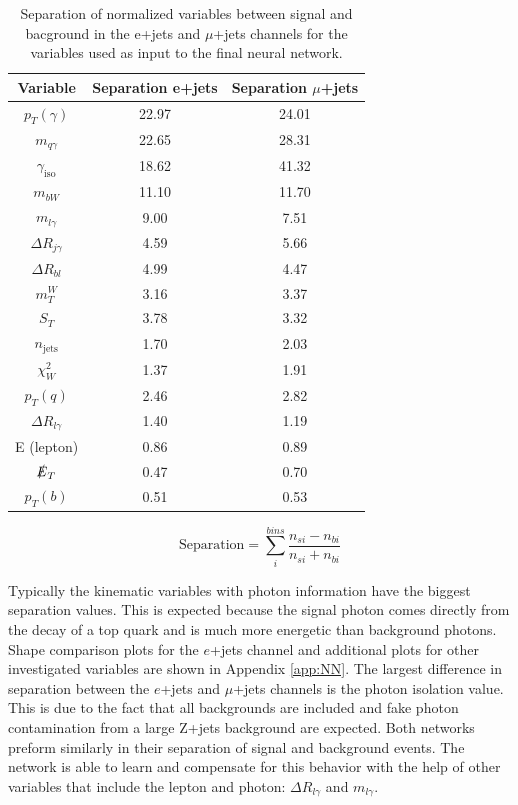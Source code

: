 \begin{table}[]
\begin{center}
{\renewcommand{\arraystretch}{1.2}
\begin{tabular}{ccc}
\hline
Variable  &  Separation e+jets   & Separation $\mu$+jets   \\  \hline 
$p_T (\gamma)$            &  22.97   & 24.01	\\
$m_{q\gamma}$           &   22.65 &  28.31	\\
$\gamma_{\text{iso}}$   &  18.62   &  41.32	\\   
$m_{bW} $                    &  11.10   &  11.70 	\\
$m_{l\gamma}$             &  9.00  &   7.51	\\
$\Delta R_{j\gamma}$ &  4.59   &  5.66	\\
$\Delta R_{b l}$            &  4.99   &  4.47 	\\
$m_{T}^{W}$              &   3.16  &   3.37	\\
$S_T$                            &  3.78   &  3.32 	\\
$n_{\text{jets}}$         &  1.70   &   2.03	\\
$\chi^{2}_{W}$           &  1.37 &   1.91	 	\\
$p_T (q)$                      &  2.46    &  2.82	\\
$\Delta R_{l \gamma}$ &   1.40 &  1.19		\\
E (lepton)                       &  0.86  &  0.89	\\	
$\slashed{E}_T  $          &   0.47  & 0.70 	\\
$p_T (b)$                       &  0.51    &  0.53	\\ \hline
\end{tabular}
\caption{Separation of normalized variables between signal and bacground in the e+jets and $\mu$+jets channels for the variables used as input to the final neural network.  }
\label{tab:Separations}
}
\end{center}
\end{table}

\[ \text{Separation} = \sum_{i}^{bins} \frac {n_{s i}-n_{b i}}{n_{s i}+n_{b i}}\]

Typically the kinematic variables with photon information have the biggest separation values.  This is expected because the signal photon comes directly from the decay of a top quark and is much more energetic than background photons.  Shape comparison plots for the $e$+jets channel and additional plots for other investigated variables are shown in Appendix \ref{app:NN}.  The largest difference in separation between the $e$+jets and $\mu$+jets channels is the photon isolation value.  This is due to the fact that all backgrounds are included and fake photon contamination from a large Z+jets background are expected.  Both networks preform similarly in their separation of signal and background events.  The network is able to learn and compensate for this behavior with the help of other variables that include the lepton and photon: $\Delta R_{l \gamma}$ and $m_{l\gamma}$.

